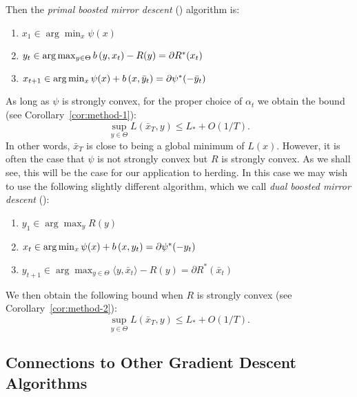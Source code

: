 \documentclass[paper.tex]{subfiles}
\begin{document}
Then 
the {\em primal boosted mirror descent} (\primal) algorithm is:
\begin{enumerate}
\item $x_1 \in \arg\min_x \psi(x)$
\item $y_{t} \in \arg\max_{y \in \Theta} b\left(y, x_t\right) - R(y) = \partial R^{*}(x_{t})$
\item $x_{t+1} \in \arg\min_{x} \psi(x) + b\left(x, \bar{y}_t\right) = \partial \psi^{*}(-\bar y_{t})$
\end{enumerate}
As long as $\psi$ is strongly convex, for the proper choice of $\alpha_{t}$ we obtain the 
bound (see Corollary~\ref{cor:method-1}):
\begin{equation}
\sup_{y \in \Theta} L(\bar{x}_T, y) \leq L_{*} + O(1/T).
\end{equation}
In other words, $\bar{x}_T$ is close to being a global minimum of $L(x)$.
However, it is often the case that $\psi$ is not strongly convex but $R$ is strongly convex. As we shall see, this will be the case for our application to herding.
In this case we may wish to use the following slightly different algorithm, which we call {\em dual boosted mirror descent} (\dual):
\begin{enumerate}
\item $y_1 \in \arg\max_{y} R(y)$
\item $x_t \in \arg\min_{x} \psi(x) + b\left(x, y_t\right) = \partial \psi^{*}(-y_{t})$
\item $y_{t+1} \in \arg\max_{y \in \Theta} \langle y, \bar{x}_t \rangle - R(y) = \partial R^{*}(\bar x_{t})$
\end{enumerate}
We then obtain the following bound 
when $R$ is strongly convex (see Corollary~\ref{cor:method-2}):
\[ \sup_{y \in \Theta} L(\bar{x}_T, y) \leq L_{*} + O(1/T). \]



\subsection{Connections to Other Gradient Descent Algorithms}
\end{document}
